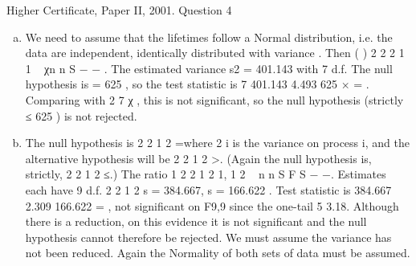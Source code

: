 \documentclass[a4paper,12pt]{article}
\begin{document}

Higher Certificate, Paper II, 2001. Question 4
\begin{enumerate}[(a)]
\item  We need to assume that the lifetimes follow a Normal distribution, i.e. the data
are independent, identically distributed with variance  .
Then ( ) 2
2
2 1
1
~ χn
n S
\sigma −
−
.
The estimated variance s2 = 401.143 with 7 d.f.
The null hypothesis is  = 625 , so the test statistic is 7 401.143 4.493
625
× = .
Comparing with 2
7 χ , this is not significant, so the null hypothesis (strictly  ≤ 625 )
is not rejected.
\item The null hypothesis is 2 2
1 2 \sigma =\sigma where 2
i \sigma
is the variance on process i, and the
alternative hypothesis will be 2 2
1 2 \sigma >\sigma . (Again the null hypothesis is, strictly,
2 2
1 2 \sigma ≤\sigma .)
The ratio 1 2
2
1
2 1, 1
2
~ n n
S F
S − −. Estimates each have 9 d.f. 2 2
1 2 s = 384.667, s = 166.622 .
Test statistic is 384.667 2.309
166.622
= , not significant on F9,9 since the one-tail 5%
3.18.
Although there is a reduction, on this evidence it is not significant and the null
hypothesis cannot therefore be rejected. We must assume the variance has not been
reduced. Again the Normality of both sets of data must be assumed.

\end{enumerate}
\end{document}

